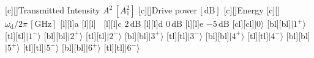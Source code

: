 

\figstyle
 [c][]{Transmitted Intensity $A^2\,[A_1^2]$}
 [c][]{Drive power$\,[\text{dB}]$}
 [c][]{Energy}
 [c][]{$\omega_\text{d}/2\pi\, [\text{GHz}]$}
 [l][l]{\panelstyle a}
 [l][l]{\panelstyle \textcolor{white}{b}}
 [l][l]{{\panelstyle c } $2$\,dB}
 [l][l]{{\panelstyle d } $0$\,dB}
 [l][l]{{\panelstyle e } $-5$\,dB}
 [cl][cl]{\figsmallest$\lvert0\rangle$}
 [bl][bl]{\figsmallest$\lvert 1^+\rangle$}
 [tl][tl]{\figsmallest$\lvert 1^-\rangle$}
 [bl][bl]{\figsmallest$\lvert 2^+\rangle$}
 [tl][tl]{\figsmallest$\lvert 2^-\rangle$}
 [bl][bl]{\figsmallest$\lvert 3^+\rangle$}
 [tl][tl]{\figsmallest$\lvert 3^-\rangle$}
 [bl][bl]{\figsmallest$\lvert 4^+\rangle$}
 [tl][tl]{\figsmallest$\lvert 4^-\rangle$}
 [bl][bl]{\figsmallest$\lvert 5^+\rangle$}
 [tl][tl]{\figsmallest$\lvert 5^-\rangle$}
 [bl][bl]{\figsmallest$\lvert 6^+\rangle$}
 [tl][tl]{\figsmallest$\lvert 6^-\rangle$}
